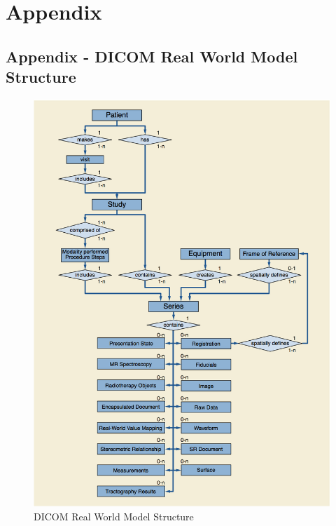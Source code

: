 \documentclass[12pt,twoside]{article}
\begin{document}
\clearpage
\section{Appendix}
\subsection {Appendix - DICOM Real World Model Structure}

\begin{appendices}
\begin{figure}[ht]
\centering
\includegraphics[width = 0.95\hsize]{./figures/DICOMRealWorldModel}
\caption{DICOM Real World Model Structure}
\end{figure}



\clearpage


\end{appendices}
\end{document}
